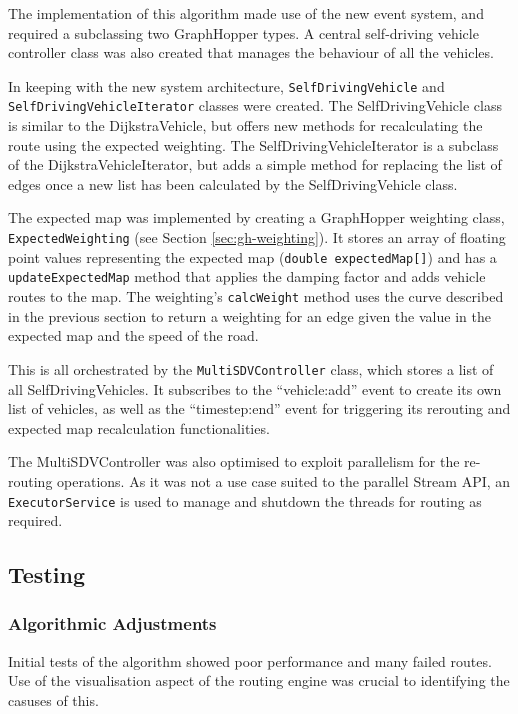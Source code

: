 \documentclass[ %
                    author={Alexander Hill},
                supervisor={Dr. Benjamin Sach},
                    degree={MEng},
                     title={MARMOSET},
                  subtitle={Multi-Agent Route Management using Online Simulation for Efficient Transportation},
                      type={research},
                      year={2016} ]{dissertation}
\begin{document}
The implementation of this algorithm made use of the new event system, and
required a subclassing two GraphHopper types. A central self-driving vehicle
controller class was also created that manages the behaviour of all the
vehicles.

In keeping with the new system architecture, \texttt{SelfDrivingVehicle} and
\texttt{SelfDrivingVehicleIterator} classes were created. The SelfDrivingVehicle
class is similar to the DijkstraVehicle, but offers new methods for
recalculating the route using the expected weighting. The
SelfDrivingVehicleIterator is a subclass of the DijkstraVehicleIterator, but
adds a simple method for replacing the list of edges once a new list has been
calculated by the SelfDrivingVehicle class.

The expected map was implemented by creating a GraphHopper weighting class,
\texttt{ExpectedWeighting} (see Section \ref{sec:gh-weighting}). It stores an
array of floating point values representing the expected map (\texttt{double
expectedMap[]}) and has a \texttt{updateExpectedMap} method that applies the
damping factor and adds vehicle routes to the map. The weighting's
\texttt{calcWeight} method uses the curve described in the previous section to
return a weighting for an edge given the value in the expected map and the speed
of the road.

This is all orchestrated by the \texttt{MultiSDVController} class, which stores
a list of all SelfDrivingVehicles. It subscribes to the ``vehicle:add'' event
to create its own list of vehicles, as well as the ``timestep:end'' event for
triggering its rerouting and expected map recalculation functionalities.

The MultiSDVController was also optimised to exploit parallelism for the
re-routing operations. As it was not a use case suited to the parallel Stream
API, an \texttt{ExecutorService} is used to manage and shutdown the threads for
routing as required.

\subsection{Testing}

\subsubsection{Algorithmic Adjustments}

Initial tests of the algorithm showed poor performance and many failed routes.
Use of the visualisation aspect of the routing engine was crucial to identifying
the casuses of this.
\end{document}
